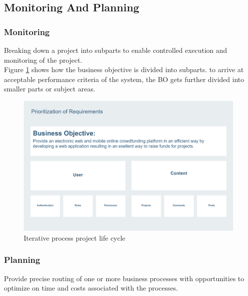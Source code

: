 \subsection{Monitoring And Planning}
\subsubsection*{Monitoring}
Breaking down a project into subparts to enable controlled execution and monitoring of the project.\\
Figure \ref{fig:bos} shows how the business objective is divided into subparts. to arrive at acceptable performance criteria of the system, the BO gets further divided into smaller parts or subject areas.
\begin{figure}[!ht]
      \center
      \includegraphics[scale=0.20]{assets/bos.png}
      \caption{Iterative process project life cycle}
      \label{fig:bos}
\end{figure}
\subsubsection*{Planning}
Provide precise routing of one or more business processes with opportunities to optimize on time and costs associated with the processes.

